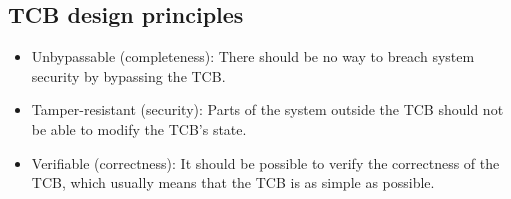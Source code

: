 \subsection{TCB design principles}
\begin{itemize}
    \item Unbypassable (completeness): There should be no way to breach system security by bypassing the TCB.
    \item Tamper-resistant (security): Parts of the system outside the TCB should not be able to modify the TCB's state.
    \item Verifiable (correctness): It should be possible to verify the correctness of the TCB, which usually means that the TCB is as simple as possible.
\end{itemize}